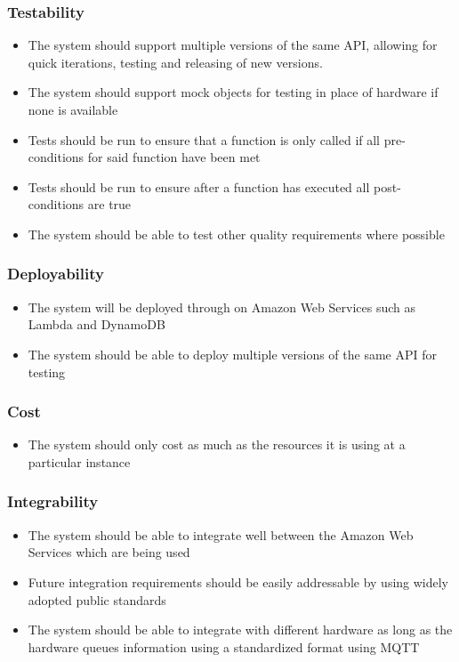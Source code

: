 \documentclass{article}
\begin{document}
\subsubsection{Testability}
	\begin{itemize}
		\item The system should support multiple versions of the same API, allowing for quick iterations, testing and releasing of new versions.
		\item The system should support mock objects for testing in place of hardware if none is available
		\item Tests should be run to ensure that a function is only called if all pre-conditions for said function have been met
		\item Tests should be run to ensure after a function has executed all post-conditions are true
		\item The system should be able to test other quality requirements where possible
	\end{itemize}
\subsubsection{Deployability}
	\begin{itemize}
		\item The system will be deployed through on Amazon Web Services such as Lambda and DynamoDB
		\item The system should be able to deploy multiple versions of the same API for testing
	\end{itemize}
\subsubsection{Cost}
	\begin{itemize}
		\item The system should only cost as much as the resources it is using at a particular instance
	\end{itemize}
\subsubsection{Integrability}
	\begin{itemize}
		\item The system should be able to integrate well between the Amazon Web Services which are being used
		\item Future integration requirements should be easily addressable by using widely adopted public standards
		\item The system should be able to integrate with different hardware as long as the hardware queues information using a standardized format using MQTT
	\end{itemize}
\end{document}
